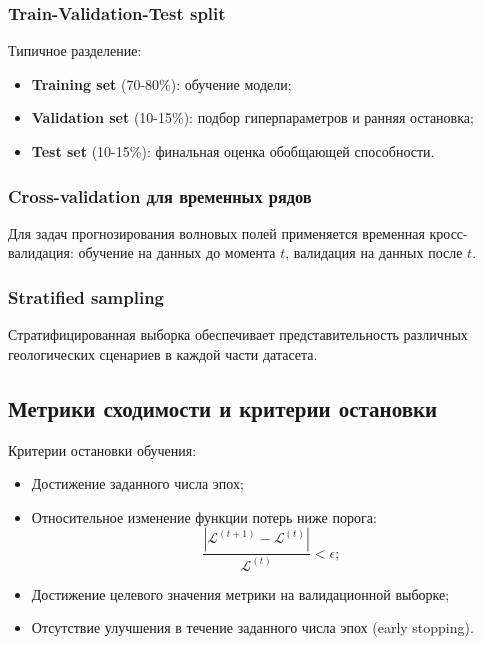 \subsubsection{Train-Validation-Test split}

Типичное разделение:
\begin{itemize}
    \item \textbf{Training set} (70-80\%): обучение модели;
    \item \textbf{Validation set} (10-15\%): подбор гиперпараметров и ранняя остановка;
    \item \textbf{Test set} (10-15\%): финальная оценка обобщающей способности.
\end{itemize}

\subsubsection{Cross-validation для временных рядов}

Для задач прогнозирования волновых полей применяется временная кросс-валидация: обучение на данных до момента $t$, валидация на данных после $t$.

\subsubsection{Stratified sampling}

Стратифицированная выборка обеспечивает представительность различных геологических сценариев в каждой части датасета.

\subsection{Метрики сходимости и критерии остановки}

Критерии остановки обучения:

\begin{itemize}
    \item Достижение заданного числа эпох;
    \item Относительное изменение функции потерь ниже порога:
    \begin{equation}
    \frac{|\mathcal{L}^{(t+1)} - \mathcal{L}^{(t)}|}{\mathcal{L}^{(t)}} < \epsilon;
    \end{equation}
    \item Достижение целевого значения метрики на валидационной выборке;
    \item Отсутствие улучшения в течение заданного числа эпох (early stopping).
\end{itemize}

